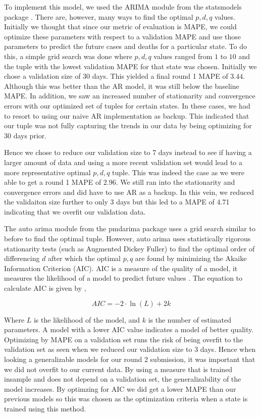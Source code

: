 \documentclass[sigconf,nonacm]{acmart}
\begin{document}
To implement this model, we used the ARIMA module from the statsmodels package
\cite{statsmodels}. There are, however, many ways to find the optimal $p,d,q$
values. Initially we thought that since our metric of evaluation is MAPE, we
could optimize these parameters with respect to a validation MAPE and use those
parameters to predict the future cases and deaths for a particular state. To do
this, a simple grid search was done where $p,d,q$ values ranged from $1$ to
$10$ and the tuple with the lowest validation MAPE for that state was chosen.
Initially we chose a validation size of 30 days. This yielded a final round 1
MAPE of $3.44$. Although this was better than the AR model, it was still below
the baseline MAPE. In addition, we saw an increased number of stationarity and
convergence errors with our optimized set of tuples for certain states. In
these cases, we had to resort to using our naive AR implementation as backup.
This indicated that our tuple was not fully capturing the trends in our data by
being optimizing for 30 days prior. 

Hence we chose to reduce our validation size to 7 days instead to see if having
a larger amount of data and using a more recent validation set would lead to a
more representative optimal $p,d,q$ tuple. This was indeed the case as we were
able to get a round 1 MAPE of 2.96. We still ran into the stationarity and
convergence errors and did have to use AR as a backup. In this vein, we reduced
the validaiton size further to only 3 days but this led to a MAPE of 4.71
indicating that we overfit our validation data. 

The auto arima module from the pmdarima package \cite{pmdarima} uses a grid
search similar to before to find the optimal tuple. However, auto arima uses
statistically rigorous stationarity tests (such as Augmented Dickey Fuller) to
find the optimal order of differencing $d$ after which the optimal $p,q$ are
found by minimizing the Akaike Information Criterion (AIC). AIC is a measure of
the quality of a model, it measures the likelihood of a model to predict future
values \cite{AIC}. The equation to calculate AIC is given by \cite{AIC},

\begin{equation}
AIC  = -2 \cdot \ln(L) + 2k
\end{equation} 

Where $L$ is the likelihood of the model, and $k$ is the number of estimated
parameters. A model with a lower AIC value indicates a model of better quality.
Optimizing by MAPE on a validation set runs the risk of being overfit to the
validation set as seen when we reduced our validation size to 3 days. Hence
when looking a generalizable models for our round 2 submission, it was
important that we did not overfit to our current data. By using a measure that
is trained insample and does not depend on a validation set, the
generalizability of the model increases. By optimzing for AIC we did get a
lower MAPE than our previous models so this was chosen as the optimization
criteria when a state is trained using this method.
\end{document}
